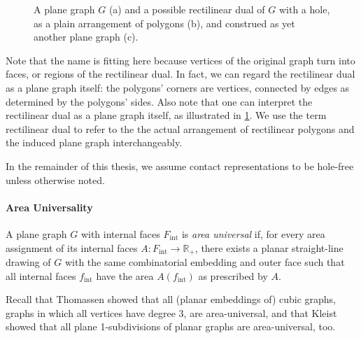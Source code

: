 \begin{figure}[H]
	\centering
	\quad
	\quad
	\caption{A plane graph $G$ (a) and a possible rectilinear dual of $G$ with a hole, as a plain arrangement of polygons (b), and construed as yet another plane graph (c).}
	\label{fig:preliminaries-rectilinear-dual}
\end{figure}

Note that the name  is fitting here because vertices of the original graph turn into faces, or regions of the rectilinear dual. In fact, we can regard the rectilinear dual as a plane graph itself: the polygons' corners are vertices, connected by edges as determined by the polygons' sides. Also note that one can interpret the rectilinear dual as a plane graph itself, as illustrated in \cref{fig:preliminaries-rectilinear-dual}. We use the term rectilinear dual to refer to the the actual arrangement of rectilinear polygons and the induced plane graph interchangeably.

In the remainder of this thesis, we assume contact representations to be hole-free unless otherwise noted.



\paragraph{Area Universality}

\begin{definition}
	A plane graph $G$ with internal faces $F_\text{int}$ is \emph{area universal} if, for every area assignment of its internal faces $A \colon F_\text{int} \to \mathbb{R}_+$, there exists a planar straight-line drawing of $G$ with the same combinatorial embedding and outer face such that all internal faces $f_\text{int}$ have the area $A(f_\text{int})$ as prescribed by $A$.
\end{definition}

Recall that Thomassen \cite{thomassen1992plane} showed that all (planar embeddings of) cubic graphs, \ie{} graphs in which all vertices have degree 3, are area-universal, and that Kleist \cite{kleist2019planar} showed that all plane 1-subdivisions of planar graphs are area-universal, too.
